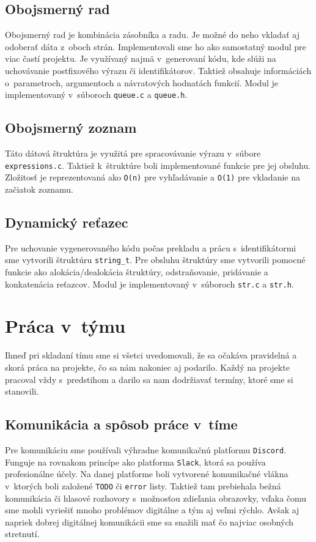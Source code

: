 \documentclass[a4paper, 11pt]{article}
\begin{document}
    \subsection{Obojsmerný rad}
    Obojsmerný rad je kombinácia zásobníka a radu. Je možné do neho vkladať aj odoberať dáta z~oboch strán.
    Implementovali sme ho ako samostatný modul pre viac častí projektu.
    Je využívaný najmä v~generovaní kódu, kde slúži na uchovávanie postfixového výrazu či
    identifikátorov. Taktiež obsahuje informáciách o~parametroch, argumentoch a návratových hodnatách funkcií.
    Modul je implementovaný v~súboroch \texttt{queue.c} a \texttt{queue.h}.

    \subsection{Obojsmerný zoznam}
    Táto dátová štruktúra je využitá pre spracovávanie výrazu v~súbore \texttt{expressions.c}. Taktiež k~štruktúre boli
    implementované funkcie pre jej obsluhu. Zložitosť je reprezentovaná ako \texttt{O(n)} pre vyhľadávanie a \texttt{O(1)}
    pre vkladanie na začiatok zoznamu.

    \subsection{Dynamický reťazec}
    Pre uchovanie vygenerovaného kódu počas prekladu a prácu s~identifikátormi sme vytvorili štruktúru \texttt{string\_t}.
    Pre obsluhu štruktúry sme vytvorili pomocné funkcie ako alokácia/dealokácia štruktúry,
    odstraňovanie, pridávanie a konkatenácia reťazcov.
    Modul je implementovaný v~súboroch \texttt{str.c} a \texttt{str.h}.


    \section{Práca v~týmu}
    Ihneď pri skladaní tímu sme si všetci uvedomovali, že sa
    očakáva pravidelná a skorá práca na projekte, čo sa nám nakoniec aj podarilo.
    Každý na projekte pracoval vždy s~predstihom a darilo sa nam dodržiavať termíny,
    ktoré sme si stanovili.


    \subsection{Komunikácia a spôsob práce v~tíme}
    Pre komunikáciu sme používali výhradne komunikačnú platformu \texttt{Discord}. Funguje na
    rovnakom princípe ako platforma \texttt{Slack}, ktorá sa používa profesionálne účely.
    Na danej platforme boli vytvorené komunikačné vlákna
    v~ktorých boli založené \texttt{TODO} či \texttt{error} listy. Taktiež tam prebiehala bežná komunikácia či hlasové rozhovory
    s~možnosťou zdieľania obrazovky, vďaka čomu sme mohli vyriešiť mnoho problémov
    digitálne a tým aj veľmi rýchlo. Avšak aj napriek
    dobrej digitálnej komunikácii sme sa snažili mať čo najviac
    osobných stretnutí.
\end{document}
